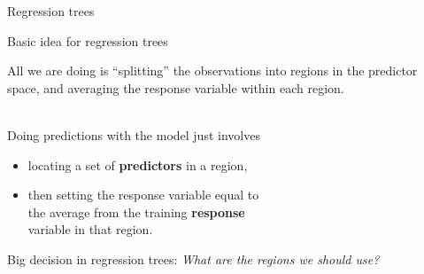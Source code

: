 \documentclass[mathserif, aspectratio=169]{beamer}
\begin{document}
\begin{frame}
\begin{center}
{\LARGE Regression trees}
\end{center}
\end{frame}

\begin{frame}{Basic idea for regression trees}

\begin{center}
All we are doing is ``splitting'' the observations into regions in the predictor space, and averaging the response variable within each region.\\~\\
\pause
\end{center}

Doing predictions with the model just involves 
\begin{itemize}
\item locating a set of \textbf{predictors} in a region, 
\item then setting the response variable equal to\\ the average from the training \textbf{response}\\ variable in that region.  
\end{itemize}
\pause

\vspace{5mm}

Big decision in regression trees: \textit{What are the regions we should use?}
\end{frame}
\end{document}
